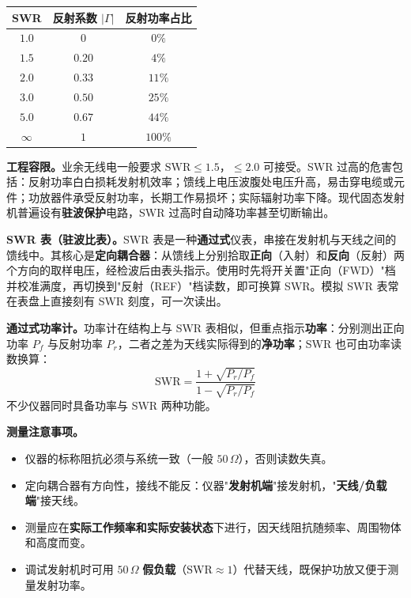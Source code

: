 \documentclass[12pt,UTF8]{ctexbook}
\begin{document}
\begin{center}
\begin{tabular}{ccc}
\hline
\textbf{SWR} & \textbf{反射系数 $|\Gamma|$} & \textbf{反射功率占比} \\
\hline
$1.0$ & $0$ & $0\%$ \\
$1.5$ & $0.20$ & $4\%$ \\
$2.0$ & $0.33$ & $11\%$ \\
$3.0$ & $0.50$ & $25\%$ \\
$5.0$ & $0.67$ & $44\%$ \\
$\infty$ & $1$ & $100\%$ \\
\hline
\end{tabular}
\end{center}

\textbf{工程容限。}业余无线电一般要求 $\mathrm{SWR}\le 1.5$，$\le 2.0$ 可接受。SWR 过高的危害包括：反射功率白白损耗发射机效率；馈线上电压波腹处电压升高，易击穿电缆或元件；功放器件承受反射功率，长期工作易损坏；实际辐射功率下降。现代固态发射机普遍设有\textbf{驻波保护}电路，SWR 过高时自动降功率甚至切断输出。

\textbf{SWR 表（驻波比表）。}SWR 表是一种\textbf{通过式}仪表，串接在发射机与天线之间的馈线中。其核心是\textbf{定向耦合器}：从馈线上分别拾取\textbf{正向}（入射）和\textbf{反向}（反射）两个方向的取样电压，经检波后由表头指示。使用时先将开关置"正向（FWD）"档并校准满度，再切换到"反射（REF）"档读数，即可换算 SWR。模拟 SWR 表常在表盘上直接刻有 SWR 刻度，可一次读出。

\textbf{通过式功率计。}功率计在结构上与 SWR 表相似，但重点指示\textbf{功率}：分别测出正向功率 $P_f$ 与反射功率 $P_r$，二者之差为天线实际得到的\textbf{净功率}；SWR 也可由功率读数换算：
\[
\mathrm{SWR} = \frac{1+\sqrt{P_r/P_f}}{1-\sqrt{P_r/P_f}}
\]
不少仪器同时具备功率与 SWR 两种功能。

\textbf{测量注意事项。}
\begin{itemize}
  \item 仪器的标称阻抗必须与系统一致（一般 $50\,\Omega$），否则读数失真。
  \item 定向耦合器有方向性，接线不能反：仪器"\textbf{发射机端}"接发射机，"\textbf{天线/负载端}"接天线。
  \item 测量应在\textbf{实际工作频率和实际安装状态}下进行，因天线阻抗随频率、周围物体和高度而变。
  \item 调试发射机时可用 $50\,\Omega$ \textbf{假负载}（$\mathrm{SWR}\approx 1$）代替天线，既保护功放又便于测量发射功率。
\end{itemize}
\end{document}
